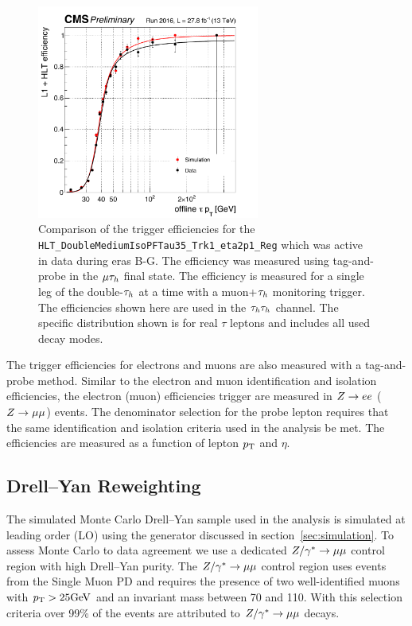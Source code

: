 \begin{figure}[!htbp]
\centering
     \includegraphics[width=0.65\textwidth]{higgs_to_taus/plots/htt_tautau_trigger_efficiency.pdf}
     \caption{
Comparison of the trigger efficiencies for the \texttt{HLT\_DoubleMediumIsoPFTau35\_Trk1\_eta2p1\_Reg}
which was active in data during eras B-G. The efficiency was measured using tag-and-probe in the
$\mu\tau_{h}$ final state. The efficiency is measured for a single leg of the double-$\tau_{h}$ at a time
with a muon+$\tau_{h}$ monitoring trigger. The efficiencies shown here are used in the $\tau_{h}\tau_{h}$ channel.
The specific distribution shown is for real $\tau$ leptons and includes all used decay modes.
}
     \label{fig:htt_tt_trig}
\end{figure}

The trigger efficiencies for electrons and muons are also measured with a tag-and-probe method.
Similar to the electron and muon identification and isolation efficiencies, the 
electron (muon) efficiencies trigger are measured in $Z\to ee$ ($Z\to\mu\mu$) events.
The denominator selection for the probe lepton requires that the same identification and
isolation criteria used in the analysis be met. The efficiencies are measured as a function of
lepton $p_\mathrm{T}$ and $\eta$.



\subsection{Drell--Yan Reweighting}

The simulated Monte Carlo Drell--Yan sample used in the analysis is simulated at leading order (LO)
using the \aMCATNLO generator discussed in section~\ref{sec:simulation}. To assess Monte Carlo to
data agreement we use a dedicated $Z/\gamma^*\to\mu\mu$ control region with high Drell--Yan purity.
The $Z/\gamma^*\to\mu\mu$ control region uses events from the Single Muon PD and requires the 
presence of two well-identified muons with $p_\mathrm{T} > 25 \mathrm{GeV}$ and an invariant mass between 70 and 110\GeV.
With this selection criteria over 99\% of the events are attributed to $Z/\gamma^*\to\mu\mu$ decays.

